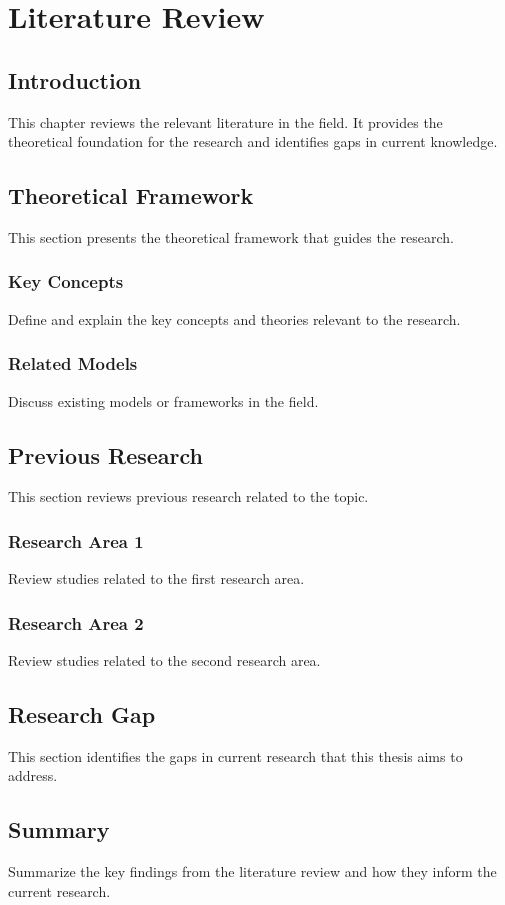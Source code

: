 \chapter{Literature Review}
\label{ch:literature}

\section{Introduction}
This chapter reviews the relevant literature in the field. It provides the theoretical foundation for the research and identifies gaps in current knowledge.

\section{Theoretical Framework}
This section presents the theoretical framework that guides the research.

\subsection{Key Concepts}
Define and explain the key concepts and theories relevant to the research.

\subsection{Related Models}
Discuss existing models or frameworks in the field.

\section{Previous Research}
This section reviews previous research related to the topic.

\subsection{Research Area 1}
Review studies related to the first research area.

\subsection{Research Area 2}
Review studies related to the second research area.

\section{Research Gap}
This section identifies the gaps in current research that this thesis aims to address.

\section{Summary}
Summarize the key findings from the literature review and how they inform the current research.

